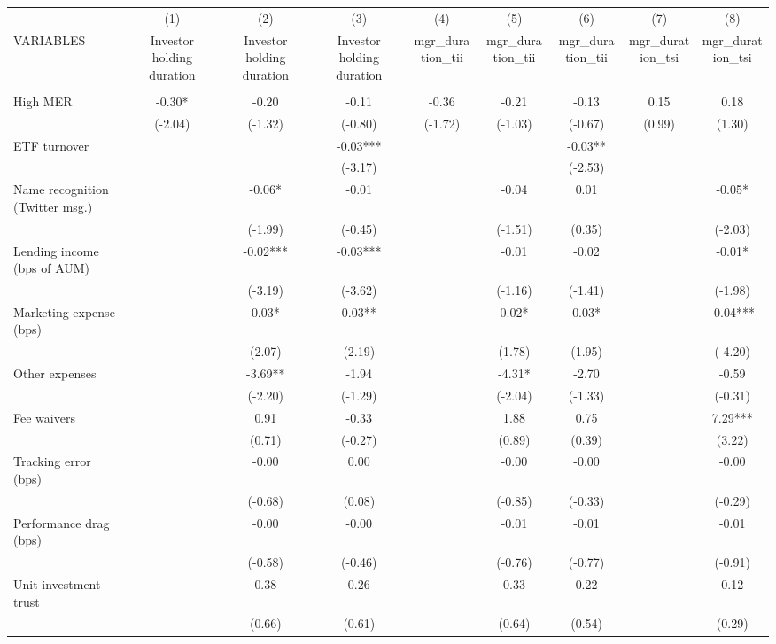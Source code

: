 \documentclass[]{article}
\begin{document}
\begin{tabular}{lcccccccc} \hline
 & (1) & (2) & (3) & (4) & (5) & (6) & (7) & (8) \\
VARIABLES & Investor holding duration & Investor holding duration & Investor holding duration & mgr\_duration\_tii & mgr\_duration\_tii & mgr\_duration\_tii & mgr\_duration\_tsi & mgr\_duration\_tsi \\ \hline
 &  &  &  &  &  &  &  &  \\
High MER & -0.30* & -0.20 & -0.11 & -0.36 & -0.21 & -0.13 & 0.15 & 0.18 \\
 & (-2.04) & (-1.32) & (-0.80) & (-1.72) & (-1.03) & (-0.67) & (0.99) & (1.30) \\
ETF turnover &  &  & -0.03*** &  &  & -0.03** &  &  \\
 &  &  & (-3.17) &  &  & (-2.53) &  &  \\
Name recognition (Twitter msg.) &  & -0.06* & -0.01 &  & -0.04 & 0.01 &  & -0.05* \\
 &  & (-1.99) & (-0.45) &  & (-1.51) & (0.35) &  & (-2.03) \\
Lending income (bps of AUM) &  & -0.02*** & -0.03*** &  & -0.01 & -0.02 &  & -0.01* \\
 &  & (-3.19) & (-3.62) &  & (-1.16) & (-1.41) &  & (-1.98) \\
Marketing expense (bps) &  & 0.03* & 0.03** &  & 0.02* & 0.03* &  & -0.04*** \\
 &  & (2.07) & (2.19) &  & (1.78) & (1.95) &  & (-4.20) \\
Other expenses &  & -3.69** & -1.94 &  & -4.31* & -2.70 &  & -0.59 \\
 &  & (-2.20) & (-1.29) &  & (-2.04) & (-1.33) &  & (-0.31) \\
Fee waivers &  & 0.91 & -0.33 &  & 1.88 & 0.75 &  & 7.29*** \\
 &  & (0.71) & (-0.27) &  & (0.89) & (0.39) &  & (3.22) \\
Tracking error (bps) &  & -0.00 & 0.00 &  & -0.00 & -0.00 &  & -0.00 \\
 &  & (-0.68) & (0.08) &  & (-0.85) & (-0.33) &  & (-0.29) \\
Performance drag (bps) &  & -0.00 & -0.00 &  & -0.01 & -0.01 &  & -0.01 \\
 &  & (-0.58) & (-0.46) &  & (-0.76) & (-0.77) &  & (-0.91) \\
Unit investment trust &  & 0.38 & 0.26 &  & 0.33 & 0.22 &  & 0.12 \\
 &  & (0.66) & (0.61) &  & (0.64) & (0.54) &  & (0.29) \\

\end{tabular}
\end{document}
